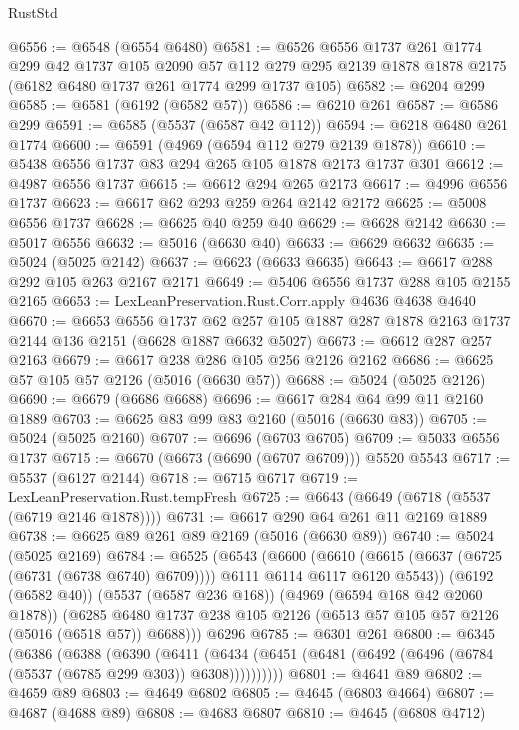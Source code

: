 \begin{lexlean}{RustStd}
\begin{coremodule}
@6556 := @6548 (@6554 @6480)
@6581 := @6526
    @6556
    @1737
    @261
    @1774
    @299
    @42
    @1737
    @105
    @2090
    @57
    @112
    @279
    @295
    @2139
    @1878
    @1878
    @2175
    (@6182 @6480 @1737 @261 @1774 @299 @1737 @105)
@6582 := @6204 @299
@6585 := @6581 (@6192 (@6582 @57))
@6586 := @6210 @261
@6587 := @6586 @299
@6591 := @6585 (@5537 (@6587 @42 @112))
@6594 := @6218 @6480 @261 @1774
@6600 := @6591 (@4969 (@6594 @112 @279 @2139 @1878))
@6610 := @5438 @6556 @1737 @83 @294 @265 @105 @1878 @2173 @1737 @301
@6612 := @4987 @6556 @1737
@6615 := @6612 @294 @265 @2173
@6617 := @4996 @6556 @1737
@6623 := @6617 @62 @293 @259 @264 @2142 @2172
@6625 := @5008 @6556 @1737
@6628 := @6625 @40 @259 @40
@6629 := @6628 @2142
@6630 := @5017 @6556
@6632 := @5016 (@6630 @40)
@6633 := @6629 @6632
@6635 := @5024 (@5025 @2142)
@6637 := @6623 (@6633 @6635)
@6643 := @6617 @288 @292 @105 @263 @2167 @2171
@6649 := @5406 @6556 @1737 @288 @105 @2155 @2165
@6653 := LexLeanPreservation.Rust.Corr.apply @4636 @4638 @4640
@6670 := @6653
    @6556
    @1737
    @62
    @257
    @105
    @1887
    @287
    @1878
    @2163
    @1737
    @2144
    @136
    @2151
    (@6628 @1887 @6632 @5027)
@6673 := @6612 @287 @257 @2163
@6679 := @6617 @238 @286 @105 @256 @2126 @2162
@6686 := @6625 @57 @105 @57 @2126 (@5016 (@6630 @57))
@6688 := @5024 (@5025 @2126)
@6690 := @6679 (@6686 @6688)
@6696 := @6617 @284 @64 @99 @11 @2160 @1889
@6703 := @6625 @83 @99 @83 @2160 (@5016 (@6630 @83))
@6705 := @5024 (@5025 @2160)
@6707 := @6696 (@6703 @6705)
@6709 := @5033 @6556 @1737
@6715 := @6670 (@6673 (@6690 (@6707 @6709))) @5520 @5543
@6717 := @5537 (@6127 @2144)
@6718 := @6715 @6717
@6719 := LexLeanPreservation.Rust.tempFresh
@6725 := @6643 (@6649 (@6718 (@5537 (@6719 @2146 @1878))))
@6731 := @6617 @290 @64 @261 @11 @2169 @1889
@6738 := @6625 @89 @261 @89 @2169 (@5016 (@6630 @89))
@6740 := @5024 (@5025 @2169)
@6784 := @6525
    (@6543
      (@6600
        (@6610 (@6615 (@6637 (@6725 (@6731 (@6738 @6740) @6709)))) @6111 @6114 @6117 @6120 @5543))
      (@6192 (@6582 @40))
      (@5537 (@6587 @236 @168))
      (@4969 (@6594 @168 @42 @2060 @1878))
      (@6285 @6480 @1737 @238 @105 @2126 (@6513 @57 @105 @57 @2126 (@5016 (@6518 @57)) @6688)))
    @6296
@6785 := @6301 @261
@6800 := @6345
    (@6386
      (@6388
        (@6390
          (@6411 (@6434 (@6451 (@6481 (@6492 (@6496 (@6784 (@5537 (@6785 @299 @303)) @6308))))))))))
@6801 := @4641 @89
@6802 := @4659 @89
@6803 := @4649 @6802
@6805 := @4645 (@6803 @4664)
@6807 := @4687 (@4688 @89)
@6808 := @4683 @6807
@6810 := @4645 (@6808 @4712)

\end{coremodule}
\end{lexlean}
